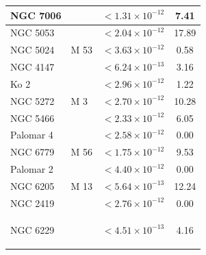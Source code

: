 \begin{longtable}{|l|l|l|c|}
NGC 7006 & & $<1.31\times 10^{-12}$ & 7.41 \\\hline
NGC 5053 & & $<2.04\times 10^{-12}$ & 17.89 \\\hline
NGC 5024 & M 53 & $<3.63\times 10^{-12}$ & 0.58 \\\hline
NGC 4147 & & $<6.24\times 10^{-13}$ & 3.16 \\\hline
Ko 2 & & $<2.96\times 10^{-12}$ & 1.22 \\\hline
NGC 5272 &M 3   & $<2.70\times 10^{-12}$ & 10.28 \\\hline
NGC 5466 & & $<2.33\times 10^{-12}$ & 6.05 \\\hline
Palomar 4 & & $<2.58\times 10^{-12}$ & 0.00 \\\hline
NGC 6779 & M 56& $<1.75\times 10^{-12}$ & 9.53 \\\hline
Palomar 2 & & $<4.40\times 10^{-12}$ & 0.00 \\\hline
NGC 6205 & M 13  & $<5.64\times 10^{-13}$ & 12.24 \\\hline
NGC 2419 & & $<2.76\times 10^{-12}$ & 0.00 \\\hline
NGC 6229 & & $<4.51\times 10^{-13}$ & 4.16 

\label{tab:low_TS}
\end{longtable}
\endgroup
